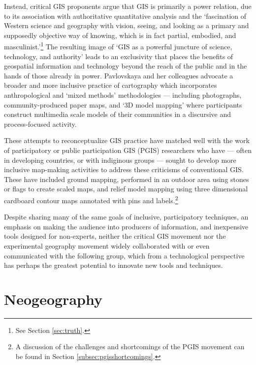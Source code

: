 \documentclass[11pt]{report}
\begin{document}
Instead, critical GIS proponents argue that GIS is primarily a power relation, due to its association with authoritative quantitative analysis and the `fascination of Western science and geography with vision, seeing, and looking as a primary and supposedly objective way of knowing, which is in fact partial, embodied, and masculinist.'\cite{pavlovskaya2009nonquantitative}\footnote{See Section \ref{sec:truth}.} The resulting image of `GIS as a powerful juncture of science, technology, and authority'\cite{pavlovskaya2009nonquantitative} leads to an exclusivity that places the benefits of geospatial information and technology beyond the reach of the public and in the hands of those already in power. Pavlovskaya and her colleagues advocate a broader and more inclusive practice of cartography which incorporates anthropological and `mixed methods' methodologies --- including photographs, community-produced paper maps, and `3D model mapping' where participants construct multimedia scale models of their communities in a discursive and process-focused activity. 

These attempts to reconceptualize GIS practice have matched well with the work of participatory or public participation GIS (PGIS) researchers who have --- often in developing countries, or with indiginous groups --- sought to develop more inclusive map-making activities to address these criticisms of conventional GIS. These have included ground mapping, performed in an outdoor area using stones or flags to create scaled maps, and relief model mapping using three dimensional cardboard contour maps annotated with pins and labels.\footnote{A discussion of the challenges and shortcomings of the PGIS movement can be found in Section \ref{subsec:pgisshortcomings}.}

Despite sharing many of the same goals of inclusive, participatory techniques, an emphasis on making the audience into producers of information, and inexpensive tools designed for non-experts, neither the critical GIS movement nor the experimental geography movement widely collaborated with or even communicated with the following group, which from a technological perspective has perhaps the greatest potential to innovate new tools and techniques. 

\section{Neogeography}
\label{sec:neogeography}
\end{document}
